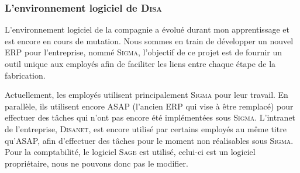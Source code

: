 \subsubsection{L'environnement logiciel de \textsc{Disa}}

L'environnement logiciel de la compagnie a évolué durant mon apprentissage et est encore en cours de mutation.
Nous sommes en train de développer un nouvel ERP pour l'entreprise, nommé \textsc{Sigma}, l'objectif de ce projet est de fournir un outil unique aux employés afin de faciliter les liens entre chaque étape de la fabrication.

Actuellement, les employés utilisent principalement \textsc{Sigma} pour leur travail.
En parallèle, ils utilisent encore ASAP (l'ancien ERP qui vise à être remplacé) pour effectuer des tâches qui n'ont pas encore été implémentées sous \textsc{Sigma}.
L'intranet de l'entreprise, \textsc{Disanet}, est encore utilisé par certains employés au même titre qu'ASAP, afin d'effectuer des tâches pour le moment non réalisables sous \textsc{Sigma}.
Pour la comptabilité, le logiciel \textsc{Sage} est utilisé, celui-ci est un logiciel propriétaire, nous ne pouvons donc pas le modifier.
\\
